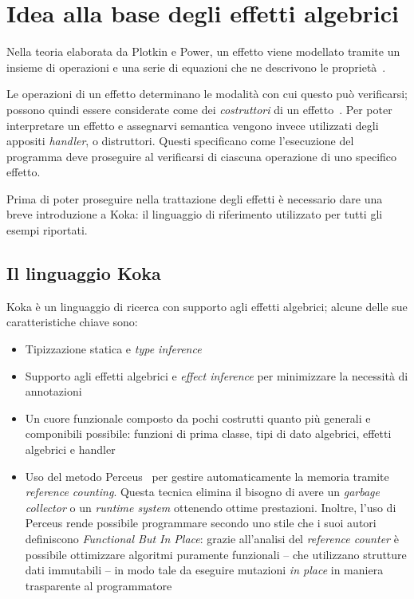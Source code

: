 \section{Idea alla base degli effetti algebrici}
Nella teoria elaborata da Plotkin e Power, un effetto viene modellato tramite un insieme di operazioni e una serie di equazioni che ne descrivono le proprietà~\cite{cit:handling-algebraic-effects,cit:computational-effects-and-operations-an-overview}.

Le operazioni di un effetto determinano le modalità con cui questo può verificarsi; possono quindi essere considerate come dei \emph{costruttori} di un effetto~\cite{cit:algebraic-operations-and-generic-effects}.
Per poter interpretare un effetto e assegnarvi semantica vengono invece utilizzati degli appositi \emph{handler}, o distruttori. Questi specificano come l'esecuzione del programma deve proseguire al verificarsi di ciascuna operazione di uno specifico effetto.

Prima di poter proseguire nella trattazione degli effetti è necessario dare una breve introduzione a Koka: il linguaggio di riferimento utilizzato per tutti gli esempi riportati.

\subsection{Il linguaggio Koka}
Koka è un linguaggio di ricerca con supporto agli effetti algebrici; alcune delle sue caratteristiche chiave sono:
\begin{itemize}
  \item Tipizzazione statica e \emph{type inference}
  \item Supporto agli effetti algebrici e \emph{effect inference} per minimizzare la necessità di annotazioni
  \item Un cuore funzionale composto da pochi costrutti quanto più generali e componibili possibile: funzioni di prima classe, tipi di dato algebrici, effetti algebrici e handler
  \item Uso del metodo Perceus~\cite{cit:perceus-garbage-free-reference-counting-with-reuse} per gestire automaticamente la memoria tramite \emph{reference counting}. Questa tecnica elimina il bisogno di avere un \emph{garbage collector} o un \emph{runtime system} ottenendo ottime prestazioni. Inoltre, l'uso di Perceus rende possibile programmare secondo uno stile che i suoi autori definiscono \emph{Functional But In Place}: grazie all'analisi del \emph{reference counter} è possibile ottimizzare algoritmi puramente funzionali -- che utilizzano strutture dati immutabili -- in modo tale da eseguire mutazioni \emph{in place} in maniera trasparente al programmatore~\cite{cit:koka-benchmarks}
\end{itemize}


